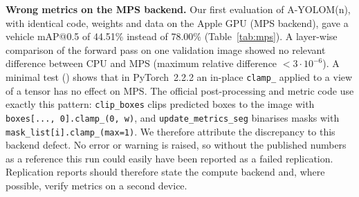 {\textbf{Wrong metrics on the MPS backend.} Our first evaluation of A-YOLOM(n), with identical code, weights and data on the Apple GPU (MPS backend), gave a vehicle mAP@0.5 of 44.51\% instead of 78.00\% (Table~\ref{tab:mps}). A layer-wise comparison of the forward pass on one validation image showed no relevant difference between CPU and MPS (maximum relative difference $<3\cdot10^{-6}$). A minimal test () shows that in PyTorch~2.2.2 an in-place \texttt{clamp\_} applied to a view of a tensor has no effect on MPS. The official post-processing and metric code use exactly this pattern: \texttt{clip\_boxes} clips predicted boxes to the image with \texttt{boxes[..., 0].clamp\_(0, w)}, and \texttt{update\_metrics\_seg} binarises masks with \texttt{mask\_list[i].clamp\_(max=1)}. We therefore attribute the discrepancy to this backend defect. No error or warning is raised, so without the published numbers as a reference this run could easily have been reported as a failed replication. Replication reports should therefore state the compute backend and, where possible, verify metrics on a second device.}
\newcommand{\ReplConclusion}{The replication confirms the published accuracy of A-YOLOM within 0.04\,pp for all ten metrics of both released models, but not the published parameter count of A-YOLOM(n), and it shows that the reported numbers also depend on how segmentation metrics are aggregated and on a correctly working compute backend}
